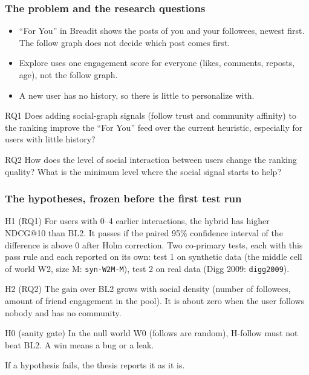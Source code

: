 \documentclass[aspectratio=169,11pt]{beamer}
\title[Breadit]{\thesistitle}
\subtitle{Progress check}
\author{Cao Ngoc Anh Tuan -- ITCSIU21244}
\institute[IU]{School of Computer Science and Engineering\\The International University, VNU-HCM}
\date{2026-11-30}
\begin{document}
\begin{frame}[plain]
  \titlepage
  \vspace{-2mm}
\end{frame}

\begin{frame}
  \frametitle{The problem and the research questions}
  \begin{itemize}
    \item ``For You'' in Breadit shows the posts of you and your followees, newest first. The follow graph does not decide which post comes first.
    \item Explore uses one engagement score for everyone (likes, comments, reposts, age), not the follow graph.
    \item A new user has no history, so there is little to personalize with.
  \end{itemize}
  \vspace{1mm}
  \begin{block}{RQ1}
    Does adding social-graph signals (follow trust and community affinity) to the ranking improve the ``For You'' feed over the current heuristic, especially for users with little history?
  \end{block}
  \begin{block}{RQ2}
    How does the level of social interaction between users change the ranking quality? What is the minimum level where the social signal starts to help?
  \end{block}
\end{frame}

\begin{frame}
  \frametitle{The hypotheses, frozen before the first test run}
  \small
  \begin{block}{H1 (RQ1)}
    For users with 0--4 earlier interactions, the hybrid has higher NDCG@10 than BL2. It passes if the paired 95\% confidence interval of the difference is above 0 after Holm correction. Two co-primary tests, each with this pass rule and each reported on its own: test 1 on synthetic data (the middle cell of world W2, size M: \texttt{syn-W2M-M}), test 2 on real data (Digg 2009: \texttt{digg2009}).
  \end{block}
  \begin{block}{H2 (RQ2)}
    The gain over BL2 grows with social density (number of followees, amount of friend engagement in the pool). It is about zero when the user follows nobody and has no community.
  \end{block}
  \begin{block}{H0 (sanity gate)}
    In the null world W0 (follows are random), H-follow must not beat BL2. A win means a bug or a leak.
  \end{block}
  \footnotesize If a hypothesis fails, the thesis reports it as it is.
\end{frame}
\end{document}
